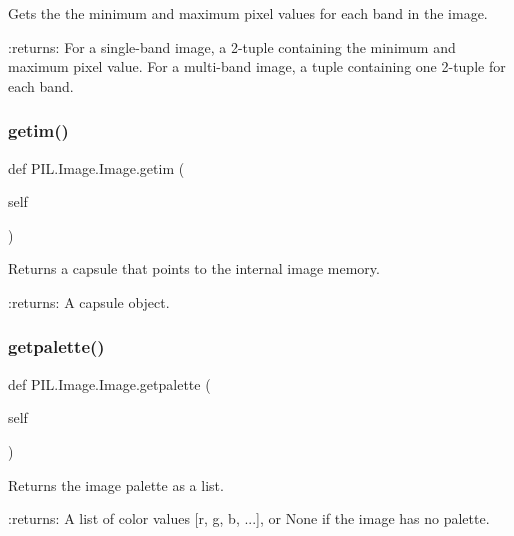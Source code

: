 \begin{DoxyVerb}Gets the the minimum and maximum pixel values for each band in
the image.

:returns: For a single-band image, a 2-tuple containing the
   minimum and maximum pixel value.  For a multi-band image,
   a tuple containing one 2-tuple for each band.
\end{DoxyVerb}
 \mbox{\label{classPIL_1_1Image_1_1Image_aba23a726014c5d3cbe1cdb200eaaf7cf}} 
\subsubsection{\texorpdfstring{getim()}{getim()}}
{\footnotesize\ttfamily def P\+I\+L.\+Image.\+Image.\+getim (\begin{DoxyParamCaption}\item[{}]{self }\end{DoxyParamCaption})}

\begin{DoxyVerb}Returns a capsule that points to the internal image memory.

:returns: A capsule object.
\end{DoxyVerb}
 \mbox{\label{classPIL_1_1Image_1_1Image_a1d358ff0a66b7b84250b7432345318e8}} 
\subsubsection{\texorpdfstring{getpalette()}{getpalette()}}
{\footnotesize\ttfamily def P\+I\+L.\+Image.\+Image.\+getpalette (\begin{DoxyParamCaption}\item[{}]{self }\end{DoxyParamCaption})}

\begin{DoxyVerb}Returns the image palette as a list.

:returns: A list of color values [r, g, b, ...], or None if the
   image has no palette.
\end{DoxyVerb}
 \mbox{\label{classPIL_1_1Image_1_1Image_ac10d83c16e92c702f4e92615cc17d88f}} 
